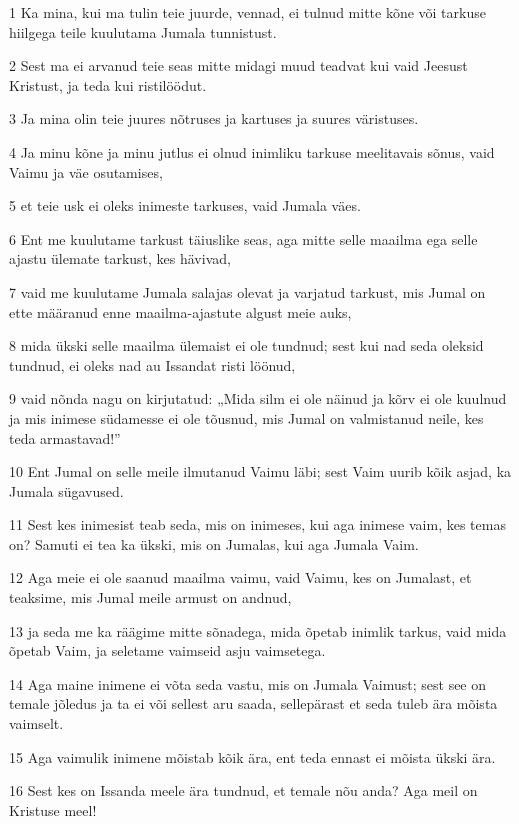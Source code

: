 \par 1 Ka mina, kui ma tulin teie juurde, vennad, ei tulnud mitte kõne või tarkuse hiilgega teile kuulutama Jumala tunnistust.
\par 2 Sest ma ei arvanud teie seas mitte midagi muud teadvat kui vaid Jeesust Kristust, ja teda kui ristilöödut.
\par 3 Ja mina olin teie juures nõtruses ja kartuses ja suures väristuses.
\par 4 Ja minu kõne ja minu jutlus ei olnud inimliku tarkuse meelitavais sõnus, vaid Vaimu ja väe osutamises,
\par 5 et teie usk ei oleks inimeste tarkuses, vaid Jumala väes.
\par 6 Ent me kuulutame tarkust täiuslike seas, aga mitte selle maailma ega selle ajastu ülemate tarkust, kes hävivad,
\par 7 vaid me kuulutame Jumala salajas olevat ja varjatud tarkust, mis Jumal on ette määranud enne maailma-ajastute algust meie auks,
\par 8 mida ükski selle maailma ülemaist ei ole tundnud; sest kui nad seda oleksid tundnud, ei oleks nad au Issandat risti löönud,
\par 9 vaid nõnda nagu on kirjutatud: „Mida silm ei ole näinud ja kõrv ei ole kuulnud ja mis inimese südamesse ei ole tõusnud, mis Jumal on valmistanud neile, kes teda armastavad!”
\par 10 Ent Jumal on selle meile ilmutanud Vaimu läbi; sest Vaim uurib kõik asjad, ka Jumala sügavused.
\par 11 Sest kes inimesist teab seda, mis on inimeses, kui aga inimese vaim, kes temas on? Samuti ei tea ka ükski, mis on Jumalas, kui aga Jumala Vaim.
\par 12 Aga meie ei ole saanud maailma vaimu, vaid Vaimu, kes on Jumalast, et teaksime, mis Jumal meile armust on andnud,
\par 13 ja seda me ka räägime mitte sõnadega, mida õpetab inimlik tarkus, vaid mida õpetab Vaim, ja seletame vaimseid asju vaimsetega.
\par 14 Aga maine inimene ei võta seda vastu, mis on Jumala Vaimust; sest see on temale jõledus ja ta ei või sellest aru saada, sellepärast et seda tuleb ära mõista vaimselt.
\par 15 Aga vaimulik inimene mõistab kõik ära, ent teda ennast ei mõista ükski ära.
\par 16 Sest kes on Issanda meele ära tundnud, et temale nõu anda? Aga meil on Kristuse meel!


